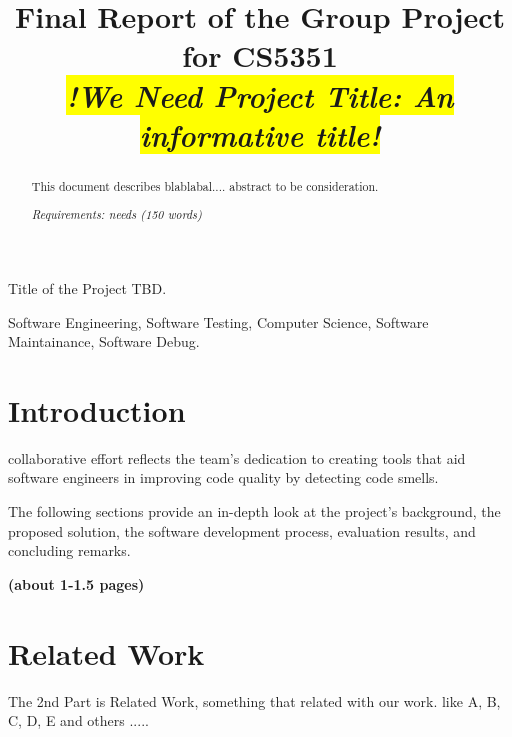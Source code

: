 \documentclass[journal]{IEEEtran}
\begin{document}
\title{Final Report of the Group Project for CS5351\\
\colorbox{yellow}{\textit{!We Need Project Title: An informative title!}}
}





%
{Title of the Project TBD.}

\maketitle

\begin{abstract}
This document describes blablabal....
abstract to be consideration.

\textit{Requirements: needs (150 words) }

\end{abstract}

\begin{IEEEkeywords}
Software Engineering, Software Testing, Computer Science, Software Maintainance, Software Debug.
\end{IEEEkeywords}


\section{Introduction}
 collaborative effort reflects the team's dedication to creating tools that aid software engineers in improving code quality by detecting code smells. 

The following sections provide an in-depth look at the project's background, the proposed solution, the software development process, evaluation results, and concluding remarks.

\textbf{(about 1-1.5 pages)}

\section{Related Work}
\noindent The 2nd Part is Related Work, something that related with our work. like A\cite{feng2023efficiency,10.1109/ICSE48619.2023.00167,10.1145/3510003.3510105}, B\cite{9793896}, C\cite{9793896}, D\cite{10.1145/2025113.2025179}, E\cite{yandrapally2023carving} and others\cite{9402052,10172611,10190433} .....
\end{document}
